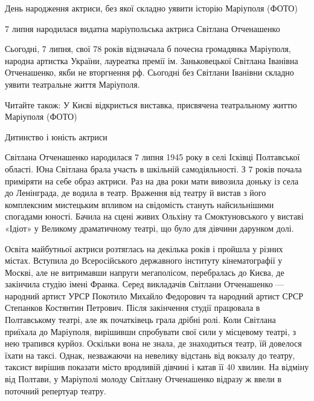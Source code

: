  
 
 
 
 

День народження актриси, без якої складно уявити історію Маріуполя (ФОТО)

7 липня народилася видатна маріупольська актриса Світлана Отченашенко

Сьогодні, 7 липня, свої 78 років відзначала б почесна громадянка Маріуполя,
народна артистка України, лауреатка премії ім. Заньковецької Світлана Іванівна
Отченашенко, якби не вторгнення рф. Сьогодні без Світлани Іванівни складно
уявити театральне життя Маріуполя.

Читайте також: У Києві відкриється виставка, присвячена театральному життю
Маріуполя (ФОТО)

Дитинство і юність актриси

Світлана Отченашенко народилася 7 липня 1945 року в селі Ісківці Полтавської
області. Юна Світлана брала участь в шкільній самодіяльності. З 7 років почала
приміряти на себе образ актриси. Раз на два роки мати вивозила доньку із села
до Ленінграда, де водила в театр. Враження від театру й вистав з його
комплексним мистецьким впливом на свідомість стануть найсильнішими спогадами
юності. Бачила на сцені живих Ольхіну та Смоктуновського у виставі «Ідіот» у
Великому драматичному театрі, що було для дівчини дарунком долі.

Освіта майбутньої актриси розтяглась на декілька років і пройшла у різних
містах. Вступила до Всеросійського державного інституту кінематографії у
Москві, але не витримавши напруги мегаполісом, перебралась до Києва, де
закінчила студію імені Франка. Серед викладачів Світлани Отченашенко — народний
артист УРСР Покотило Михайло Федорович та народний артист СРСР Степанков
Костянтин Петрович. Після закінчення студії працювала в Полтавському театрі,
але як початківець грала дрібні ролі. Коли Світлана приїхала до Маріуполя,
вирішивши спробувати свої сили у місцевому театрі, з нею трапився курйоз.
Оскільки вона не знала, де знаходиться театр, їй довелося їхати на таксі.
Однак, незважаючи на невелику відстань від вокзалу до театру, таксист вирішив
показати місто вродливій дівчині і катав її 40 хвилин. На відміну від Полтави,
у Маріуполі молоду Світлану Отченашенко відразу ж ввели в поточний репертуар
театру.

